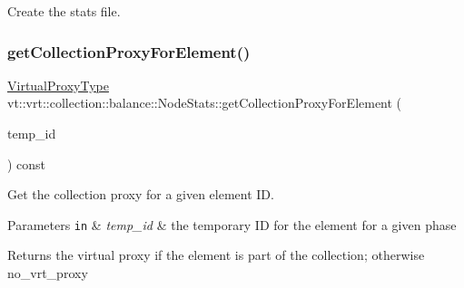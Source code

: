 Create the stats file. 

\mbox{\label{structvt_1_1vrt_1_1collection_1_1balance_1_1_node_stats_aee43291b1cc63a189b3851f92e83040b}} 
\subsubsection{\texorpdfstring{get\+Collection\+Proxy\+For\+Element()}{getCollectionProxyForElement()}}
{\footnotesize\ttfamily \hyperlink{namespacevt_a1b417dd5d684f045bb58a0ede70045ac}{Virtual\+Proxy\+Type} vt\+::vrt\+::collection\+::balance\+::\+Node\+Stats\+::get\+Collection\+Proxy\+For\+Element (\begin{DoxyParamCaption}\item[{\hyperlink{namespacevt_1_1vrt_1_1collection_1_1balance_a14c8d2c972f2913aa3f1636e5be0a120}{Element\+I\+D\+Type}}]{temp\+\_\+id }\end{DoxyParamCaption}) const}



Get the collection proxy for a given element ID. 


\begin{DoxyParams}[1]{Parameters}
\mbox{\tt in}  & {\em temp\+\_\+id} & the temporary ID for the element for a given phase\\
\hline
\end{DoxyParams}
\begin{DoxyReturn}{Returns}
the virtual proxy if the element is part of the collection; otherwise {\ttfamily no\+\_\+vrt\+\_\+proxy} 
\end{DoxyReturn}
\mbox{\label{structvt_1_1vrt_1_1collection_1_1balance_1_1_node_stats_ac1b800713117d8f017746985a66dfbd2}} 
